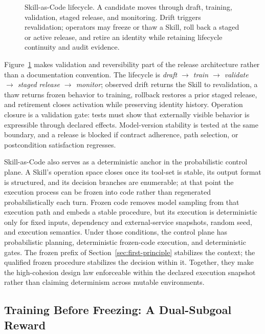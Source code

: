 \begin{figure}[t]
\centering
\caption{Skill-as-Code lifecycle. A candidate moves through draft, training, validation, staged release, and monitoring. Drift triggers revalidation; operators may freeze or thaw a Skill, roll back a staged or active release, and retire an identity while retaining lifecycle continuity and audit evidence.}
\label{fig:skill-as-code}
\end{figure}

Figure~\ref{fig:skill-as-code} makes validation and reversibility part of the release architecture rather than a documentation convention. The lifecycle is \textit{draft $\rightarrow$ train $\rightarrow$ validate $\rightarrow$ staged release $\rightarrow$ monitor}; observed drift returns the Skill to revalidation, a thaw returns frozen behavior to training, rollback restores a prior staged release, and retirement closes activation while preserving identity history. Operation closure is a validation gate: tests must show that externally visible behavior is expressible through declared effects. Model-version stability is tested at the same boundary, and a release is blocked if contract adherence, path selection, or postcondition satisfaction regresses.

Skill-as-Code also serves as a deterministic anchor in the probabilistic control plane. A Skill's operation space closes once its tool-set is stable, its output format is structured, and its decision branches are enumerable; at that point the execution process can be frozen into code rather than regenerated probabilistically each turn. Frozen code removes model sampling from that execution path and embeds a stable procedure, but its execution is deterministic only for fixed inputs, dependency and external-service snapshots, random seed, and execution semantics. Under those conditions, the control plane has probabilistic planning, deterministic frozen-code execution, and deterministic gates. The frozen prefix of Section~\ref{sec:first-principle} stabilizes the context; the qualified frozen procedure stabilizes the decision within it. Together, they make the high-cohesion design law enforceable within the declared execution snapshot rather than claiming determinism across mutable environments.

\subsection{Training Before Freezing: A Dual-Subgoal Reward}
\label{sec:training-before-freezing}

